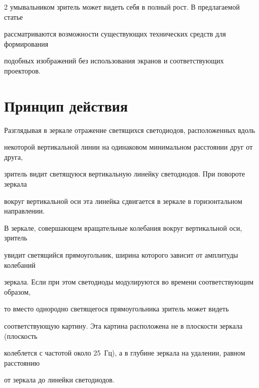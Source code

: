 \begin{multicols}{2}
умывальником зритель может видеть себя в полный рост. В предлагаемой статье 

рассматриваются возможности существующих технических средств для формирования 

подобных изображений без использования экранов и соответствующих проекторов. 



        \vspace*{-6pt}



\section{Принцип действия}



        \vspace*{-3pt}



  Разглядывая в зеркале отражение светящихся светодиодов, расположенных вдоль 

  \columnbreak

некоторой вертикальной линии на одинаковом минимальном расстоянии друг от друга, 

зритель видит светящуюся вертикальную линейку светодиодов. При повороте зеркала 

вокруг вертикальной оси эта линейка сдвигается в зеркале в горизонтальном направлении. 

В зеркале, совершающем вращательные колебания вокруг вертикальной оси, зритель 

увидит светящийся прямоугольник, ширина которого зависит от амплитуды колебаний 

зеркала. Если при этом светодиоды модулируются во времени соответствующим образом, 

то вместо однородно светящегося прямоугольника зритель может видеть 

соответствующую картину. Эта картина расположена не в плоскости зеркала (плоскость 

колеблется с частотой около 25~Гц), а в глубине зеркала на удалении, равном расстоянию 

от зеркала до линейки светодиодов. 



\begin{figure} %

\vspace*{1pt}

\begin{center}


\end{center}
\end{figure}
\end{multicols}
